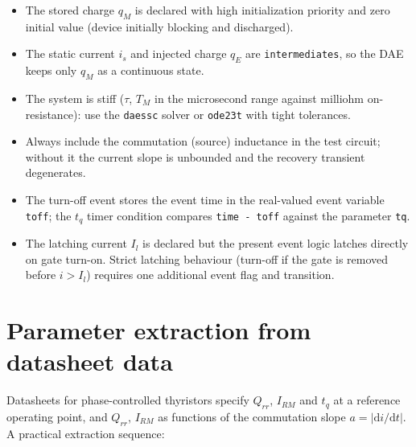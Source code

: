 \documentclass[11pt,a4paper]{article}
\begin{document}
\begin{itemize}
  \item The stored charge $q_M$ is declared with high initialization priority
        and zero initial value (device initially blocking and discharged).
  \item The static current $i_s$ and injected charge $q_E$ are
        \texttt{intermediates}, so the DAE keeps only $q_M$ as a continuous
        state.
  \item The system is stiff ($\tau$, $T_M$ in the microsecond range against
        milliohm on-resistance): use the \texttt{daessc} solver or
        \texttt{ode23t} with tight tolerances.
  \item Always include the commutation (source) inductance in the test
        circuit; without it the current slope is unbounded and the recovery
        transient degenerates.
  \item The turn-off event stores the event time in the real-valued event
        variable \texttt{toff}; the $t_q$ timer condition compares
        \texttt{time - toff} against the parameter \texttt{tq}.
  \item The latching current $I_l$ is declared but the present event logic
        latches directly on gate turn-on. Strict latching behaviour (turn-off
        if the gate is removed before $i > I_l$) requires one additional
        event flag and transition.
\end{itemize}

\section{Parameter extraction from datasheet data}

Datasheets for phase-controlled thyristors specify $Q_{rr}$, $I_{RM}$ and
$t_q$ at a reference operating point, and $Q_{rr}$, $I_{RM}$ as functions of
the commutation slope $a = |\mathrm{d}i/\mathrm{d}t|$. A practical
extraction sequence:
\end{document}
